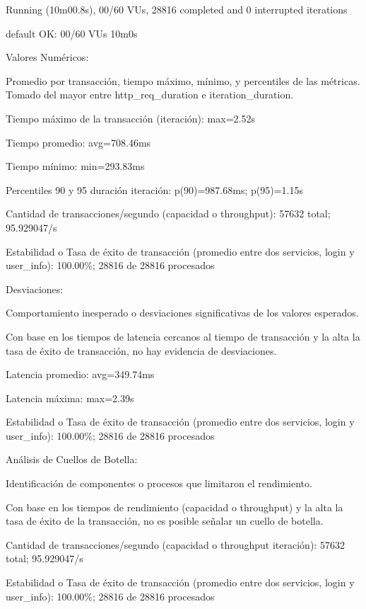 \documentclass[
  paper=a4,
  ,captions=tableheading
]{scrartcl}
\renewenvironment{quote}{\begin{customblockquote}\list{}{\rightmargin=0em\leftmargin=0em}%
\item\relax\color{blockquote-text}\ignorespaces}{\unskip\unskip\endlist\end{customblockquote}}
\begin{document}
\begin{quote}
Running (10m00.8s), 00/60 VUs, 28816 completed and 0 interrupted
iterations

default OK: 00/60 VUs 10m0s
\end{quote}

Valores Numéricos:

Promedio por transacción, tiempo máximo, mínimo, y percentiles de las
métricas. Tomado del mayor entre http\_req\_duration e
iteration\_duration.

\begin{quote}
Tiempo máximo de la transacción (iteración): max=2.52s

Tiempo promedio: avg=708.46ms

Tiempo mínimo: min=293.83ms

Percentiles 90 y 95 duración iteración: p(90)=987.68ms; p(95)=1.15s

Cantidad de transacciones/segundo (capacidad o throughput): 57632 total;
95.929047/s

Estabilidad o Tasa de éxito de transacción (promedio entre dos
servicios, login y user\_info): 100.00\%; 28816 de 28816 procesados
\end{quote}

Desviaciones:

Comportamiento inesperado o desviaciones significativas de los valores
esperados.

Con base en los tiempos de latencia cercanos al tiempo de transacción y
la alta la tasa de éxito de transacción, no hay evidencia de
desviaciones.

\begin{quote}
Latencia promedio: avg=349.74ms

Latencia máxima: max=2.39s

Estabilidad o Tasa de éxito de transacción (promedio entre dos
servicios, login y user\_info): 100.00\%; 28816 de 28816 procesados
\end{quote}

Análisis de Cuellos de Botella:

Identificación de componentes o procesos que limitaron el rendimiento.

Con base en los tiempos de rendimiento (capacidad o throughput) y la
alta la tasa de éxito de la transacción, no es posible señalar un cuello
de botella.

\begin{quote}
Cantidad de transacciones/segundo (capacidad o throughput iteración):
57632 total; 95.929047/s

Estabilidad o Tasa de éxito de transacción (promedio entre dos
servicios, login y user\_info): 100.00\%; 28816 de 28816 procesados
\end{quote}
\end{document}
